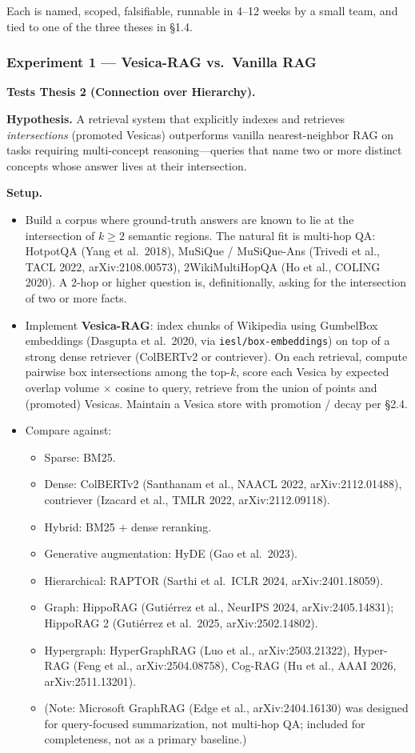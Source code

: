 \documentclass[11pt,a4paper]{article}
\begin{document}
Each is named, scoped, falsifiable, runnable in 4--12 weeks by a small team, and tied to one of the three theses in \S 1.4.

\subsubsection*{Experiment 1 --- Vesica-RAG vs.\ Vanilla RAG}

\textbf{Tests Thesis 2 (Connection over Hierarchy).}

\textbf{Hypothesis.} A retrieval system that explicitly indexes and retrieves \emph{intersections} (promoted Vesicas) outperforms vanilla nearest-neighbor RAG on tasks requiring multi-concept reasoning---queries that name two or more distinct concepts whose answer lives at their intersection.

\textbf{Setup.}

\begin{itemize}[leftmargin=*]
  \item Build a corpus where ground-truth answers are known to lie at the intersection of $k \geq 2$ semantic regions. The natural fit is multi-hop QA: HotpotQA (Yang et al.\ 2018), MuSiQue / MuSiQue-Ans (Trivedi et al., TACL 2022, arXiv:2108.00573), 2WikiMultiHopQA (Ho et al., COLING 2020). A 2-hop or higher question is, definitionally, asking for the intersection of two or more facts.
  \item Implement \textbf{Vesica-RAG}: index chunks of Wikipedia using GumbelBox embeddings (Dasgupta et al.\ 2020, via \texttt{iesl/box-embeddings}) on top of a strong dense retriever (ColBERTv2 or contriever). On each retrieval, compute pairwise box intersections among the top-$k$, score each Vesica by expected overlap volume $\times$ cosine to query, retrieve from the union of points and (promoted) Vesicas. Maintain a Vesica store with promotion / decay per \S 2.4.
  \item Compare against:
  \begin{itemize}
    \item Sparse: BM25.
    \item Dense: ColBERTv2 (Santhanam et al., NAACL 2022, arXiv:2112.01488), contriever (Izacard et al., TMLR 2022, arXiv:2112.09118).
    \item Hybrid: BM25 $+$ dense reranking.
    \item Generative augmentation: HyDE (Gao et al.\ 2023).
    \item Hierarchical: RAPTOR (Sarthi et al.\ ICLR 2024, arXiv:2401.18059).
    \item Graph: HippoRAG (Guti\'errez et al., NeurIPS 2024, arXiv:2405.14831); HippoRAG 2 (Guti\'errez et al.\ 2025, arXiv:2502.14802).
    \item Hypergraph: HyperGraphRAG (Luo et al., arXiv:2503.21322), Hyper-RAG (Feng et al., arXiv:2504.08758), Cog-RAG (Hu et al., AAAI 2026, arXiv:2511.13201).
    \item (Note: Microsoft GraphRAG (Edge et al., arXiv:2404.16130) was designed for query-focused summarization, not multi-hop QA; included for completeness, not as a primary baseline.)
  \end{itemize}
\end{itemize}
\end{document}
